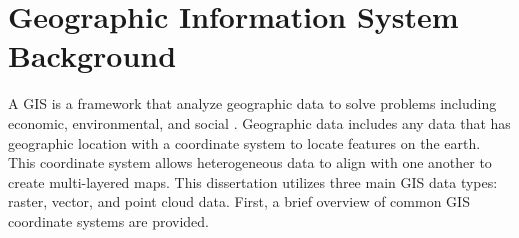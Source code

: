 













\section{Geographic Information System Background}

A \acf{GIS} is a framework that analyze geographic data to solve problems including economic, environmental, and social \cite{antenucci_geographic_1991}. Geographic data includes any data that has geographic location with a coordinate system to locate features on the earth. This coordinate system allows heterogeneous data to align with one another to create multi-layered maps. This dissertation utilizes three main \ac{GIS} data types: raster, vector, and point cloud data. First, a brief overview of common \ac{GIS} coordinate systems are provided.


